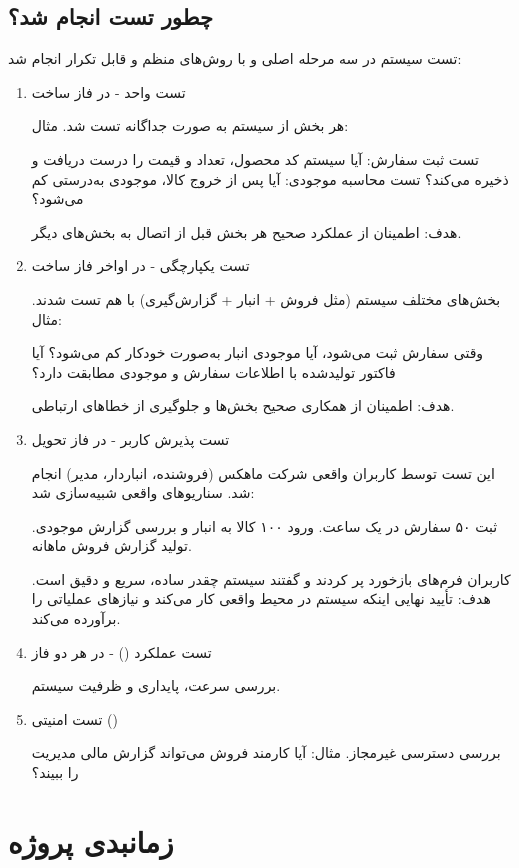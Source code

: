 \documentclass[12pt,a4paper]{report}
\begin{document}
\subsection{چطور تست انجام شد؟ }
تست سیستم در سه مرحله اصلی و با روش‌های منظم و قابل تکرار انجام شد:
\begin{enumerate}
	\item 
 تست واحد  - در فاز ساخت


هر بخش از سیستم به صورت جداگانه تست شد.
مثال:

تست ثبت سفارش: آیا سیستم کد محصول، تعداد و قیمت را درست دریافت و ذخیره می‌کند؟
تست محاسبه موجودی: آیا پس از خروج کالا، موجودی به‌درستی کم می‌شود؟


هدف: اطمینان از عملکرد صحیح هر بخش قبل از اتصال به بخش‌های دیگر.

\item 
 تست یکپارچگی  - در اواخر فاز ساخت


بخش‌های مختلف سیستم (مثل فروش + انبار + گزارش‌گیری) با هم تست شدند.
مثال:

وقتی سفارش ثبت می‌شود، آیا موجودی انبار به‌صورت خودکار کم می‌شود؟
آیا فاکتور تولیدشده با اطلاعات سفارش و موجودی مطابقت دارد؟


هدف: اطمینان از همکاری صحیح بخش‌ها و جلوگیری از خطاهای ارتباطی.

\item 
 تست پذیرش کاربر - در فاز تحویل


این تست توسط کاربران واقعی شرکت ماهکس (فروشنده، انباردار، مدیر) انجام شد.
سناریوهای واقعی شبیه‌سازی شد:

ثبت ۵۰ سفارش در یک ساعت.
ورود ۱۰۰ کالا به انبار و بررسی گزارش موجودی.
تولید گزارش فروش ماهانه.


کاربران فرم‌های بازخورد پر کردند و گفتند سیستم چقدر ساده، سریع و دقیق است.
هدف: تأیید نهایی اینکه سیستم در محیط واقعی کار می‌کند و نیازهای عملیاتی را برآورده می‌کند.

\item 
 تست عملکرد () - در هر دو فاز


بررسی سرعت، پایداری و ظرفیت سیستم.


\item 
 تست امنیتی ()


بررسی دسترسی غیرمجاز.
مثال: آیا کارمند فروش می‌تواند گزارش مالی مدیریت را ببیند؟
\end{enumerate}
\section{زمانبدی پروژه}
\end{document}
